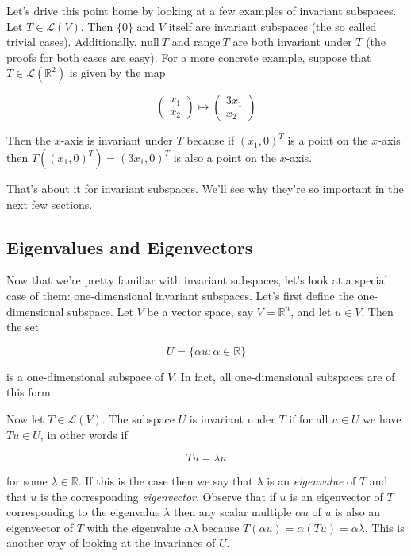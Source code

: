\documentclass[12pt]{article}
\begin{document}
Let's drive this point home by looking at a few examples of invariant subspaces. Let $T \in \mathcal{L}(V)$. Then $\{0\}$ and $V$ itself are invariant subspaces (the so called trivial cases). Additionally, $\textrm{null} \: T$ and $\textrm{range} \: T$ are both invariant under $T$ (the proofs for both cases are easy). For a more concrete example, suppose that $T \in \mathcal{L} (\mathbb{R}^2)$ is given by the map

\[ \begin{pmatrix}
x_1 \\
x_2
\end{pmatrix}
%
\mapsto
\begin{pmatrix}
3x_1 \\
x_2
\end{pmatrix}
\]

Then the $x$-axis is invariant under $T$ because if $(x_1, 0)^T$ is a point on the $x$-axis then $T((x_1, 0)^T) = (3x_1, 0)^T$ is also a point on the $x$-axis.

That's about it for invariant subspaces. We'll see why they're so important in the next few sections.


\subsection*{Eigenvalues and Eigenvectors}

Now that we're pretty familiar with invariant subspaces, let's look at a special case of them:  one-dimensional invariant subspaces. Let's first define the one-dimensional subspace.
Let $V$ be a vector space, say $V = \mathbb{R}^n$, and let $u \in V$. Then the set

$$U = \{ \alpha u : \alpha \in \mathbb{R} \}$$

is a one-dimensional subspace of $V$. In fact, all one-dimensional subspaces are of this form.

Now let $T \in \mathcal{L} (V)$. The subspace $U$ is invariant under $T$ if for all $u \in U$ we have $Tu \in U$, in other words if

$$Tu = \lambda u$$

for some $\lambda \in \mathbb{R}$. If this is the case then we say that $\lambda$ is an \textit{eigenvalue} of $T$ and that $u$ is the corresponding \textit{eigenvector}. Observe that if $u$ is an eigenvector of $T$ corresponding to the eigenvalue $\lambda$ then any scalar multiple $\alpha u$ of $u$ is also an eigenvector of $T$ with the eigenvalue $\alpha \lambda$ because $T(\alpha u) = \alpha (Tu) = \alpha \lambda$. This is another way of looking at the invariance of $U$.
\end{document}
